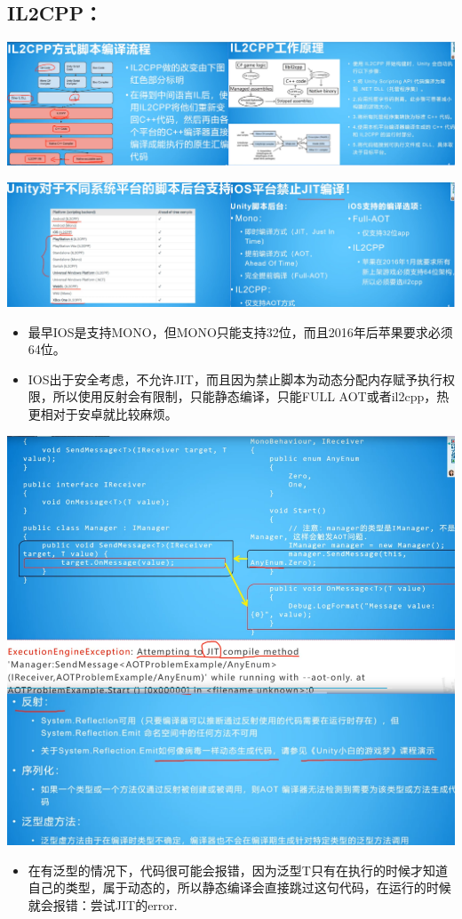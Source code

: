 \documentclass[9pt, b5paper]{article}
\begin{document}
\subsection{IL2CPP：}
\label{sec-5-2}

\includegraphics[width=.9\linewidth]{./pic/notes_20221125_094415.png}

\includegraphics[width=.9\linewidth]{./pic/notes_20221125_094520.png}
\begin{itemize}
\item 最早IOS是支持MONO，但MONO只能支持32位，而且2016年后苹果要求必须64位。
\item IOS出于安全考虑，不允许JIT，而且因为禁止脚本为动态分配内存赋予执行权限，所以使用反射会有限制，只能静态编译，只能FULL AOT或者il2cpp，热更相对于安卓就比较麻烦。
\end{itemize}

\includegraphics[width=.9\linewidth]{./pic/notes_20221125_094643.png}
\begin{itemize}
\item 在有泛型的情况下，代码很可能会报错，因为泛型T只有在执行的时候才知道自己的类型，属于动态的，所以静态编译会直接跳过这句代码，在运行的时候就会报错：尝试JIT的error.
\end{itemize}
\end{document}
